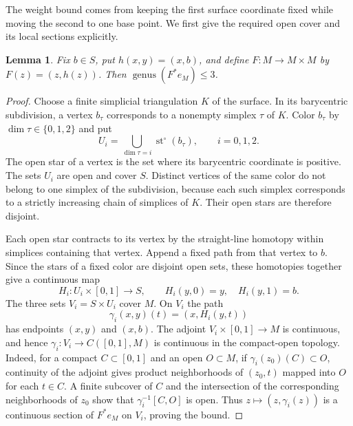 \documentclass[11pt]{article}
\newtheorem{lemma}{Lemma}
\newcommand{\genus}{\operatorname{genus}}
\begin{document}
The weight bound comes from keeping the first surface coordinate fixed
while moving the second to one base point. We first give the required
open cover and its local sections explicitly.

\begin{lemma}\label{lem:sections}
Fix $b\in S$, put $h(x,y)=(x,b)$, and define
$F:M\to M\times M$ by $F(z)=(z,h(z))$. Then
$\genus(F^*e_M)\le3$.
\end{lemma}

\begin{proof}
Choose a finite simplicial triangulation $K$ of the surface. In its
barycentric subdivision, a vertex $b_\tau$ corresponds to a nonempty
simplex $\tau$ of $K$. Color $b_\tau$ by $\dim\tau\in\{0,1,2\}$ and put
\[
 U_i=\bigcup_{\dim\tau=i}\operatorname{st}^{\circ}(b_\tau),
 \qquad i=0,1,2.
\]
The open star of a vertex is the set where its barycentric coordinate
is positive. The sets $U_i$ are open and cover $S$. Distinct vertices of
the same color do not belong to one simplex of the subdivision, because
each such simplex corresponds to a strictly increasing chain of
simplices of $K$. Their open stars are therefore disjoint.

Each open star contracts to its vertex by the straight-line homotopy
within simplices containing that vertex. Append a fixed path from that
vertex to $b$. Since the stars of a fixed color are disjoint open sets,
these homotopies together give a continuous map
\[
 H_i:U_i\times[0,1]\longrightarrow S,
 \qquad H_i(y,0)=y,\quad H_i(y,1)=b.
\]
The three sets $V_i=S\times U_i$ cover $M$. On $V_i$ the path
\[
 \gamma_i(x,y)(t)=(x,H_i(y,t))
\]
has endpoints $(x,y)$ and $(x,b)$. The adjoint
$V_i\times[0,1]\to M$ is continuous, and hence
$\gamma_i:V_i\to C([0,1],M)$ is continuous in the compact-open topology.
Indeed, for a compact $C\subset[0,1]$ and an open $O\subset M$, if
$\gamma_i(z_0)(C)\subset O$, continuity of the adjoint gives product
neighborhoods of $(z_0,t)$ mapped into $O$ for each $t\in C$. A finite
subcover of $C$ and the intersection of the corresponding neighborhoods
of $z_0$ show that $\gamma_i^{-1}[C,O]$ is open.
Thus $z\mapsto(z,\gamma_i(z))$ is a continuous section of $F^*e_M$ on
$V_i$, proving the bound.
\end{proof}
\end{document}
